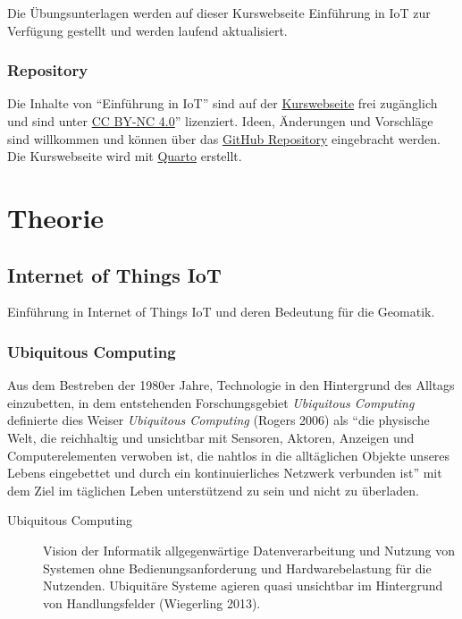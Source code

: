 \documentclass[
  11pt,
  a4paper,
  oneside, openany  ,captions=tableheading
]{scrbook}
\theoremstyle{remark}
\renewcommand{\markright}[1]{\def\chaptertitle{#1}} %
\begin{document}
Die Übungsunterlagen werden auf dieser Kurswebseite Einführung in IoT
zur Verfügung gestellt und werden laufend aktualisiert.

\section*{Repository}\label{repository}

\markright{Repository}

Die Inhalte von ``Einführung in IoT'' sind auf der
\href{https://314a.github.io/5200_IoT}{Kurswebseite} frei zugänglich und
sind unter \href{https://creativecommons.org/licenses/by-nc/4.0/}{CC
BY-NC 4.0}'' lizenziert. Ideen, Änderungen und Vorschläge sind
willkommen und können über das
\href{https://github.com/314a/5200_IoT}{GitHub Repository} eingebracht
werden. Die Kurswebseite wird mit \href{https://quarto.org/}{Quarto}
erstellt.

\part{Theorie}

\chapter{Internet of Things IoT}\label{internet-of-things-iot}

Einführung in Internet of Things IoT und deren Bedeutung für die
Geomatik.

\hfill\break

\section{Ubiquitous Computing}\label{ubiquitous-computing}

Aus dem Bestreben der 1980er Jahre, Technologie in den Hintergrund des
Alltags einzubetten, in dem entstehenden Forschungsgebiet
\emph{Ubiquitous Computing} definierte dies Weiser \emph{Ubiquitous
Computing} (Rogers 2006) als ``die physische Welt, die reichhaltig und
unsichtbar mit Sensoren, Aktoren, Anzeigen und Computerelementen
verwoben ist, die nahtlos in die alltäglichen Objekte unseres Lebens
eingebettet und durch ein kontinuierliches Netzwerk verbunden ist'' mit
dem Ziel im täglichen Leben unterstützend zu sein und nicht zu
überladen.

\begin{description}
\item[Ubiquitous Computing]
Vision der Informatik allgegenwärtige Datenverarbeitung und Nutzung von
Systemen ohne Bedienungsanforderung und Hardwarebelastung für die
Nutzenden. Ubiquitäre Systeme agieren quasi unsichtbar im Hintergrund
von Handlungsfelder (Wiegerling 2013).
\end{description}
\end{document}
